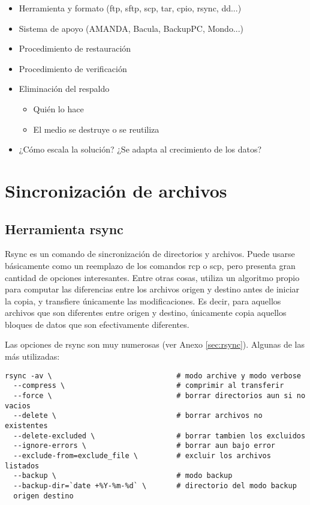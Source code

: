 \begin{itemize}
	\item Herramienta y formato (ftp, sftp, scp, tar, cpio, rsync, dd...)  
	\item Sistema de apoyo (AMANDA, Bacula, BackupPC, Mondo...)
	\item Procedimiento de restauración
	\item Procedimiento de verificación
	\item Eliminación del respaldo
	\begin{itemize}
		\item Quién lo hace
		\item El medio se destruye o se reutiliza 
	\end{itemize}
	\item ¿Cómo escala la solución? ¿Se adapta al crecimiento de los datos?
\end{itemize}



\section{Sincronización de archivos}

\subsection{Herramienta rsync}

Rsync es un comando de sincronización de directorios y archivos. Puede usarse básicamente como un reemplazo de los comandos rcp o scp, pero presenta gran cantidad de opciones interesantes. Entre otras cosas, utiliza un algoritmo propio para computar las diferencias entre los archivos origen y destino antes de iniciar la copia, y transfiere únicamente las modificaciones. Es decir, para aquellos archivos que son diferentes entre origen y destino, únicamente copia aquellos bloques de datos que son efectivamente diferentes.  

Las opciones de rsync son muy numerosas (ver Anexo \ref{sec:rsync}). Algunas de las más utilizadas:


\begin{lstlisting}
rsync -av \                             # modo archive y modo verbose
  --compress \                          # comprimir al transferir
  --force \                             # borrar directorios aun si no vacios
  --delete \                            # borrar archivos no existentes
  --delete-excluded \                   # borrar tambien los excluidos
  --ignore-errors \                     # borrar aun bajo error
  --exclude-from=exclude_file \         # excluir los archivos listados
  --backup \                            # modo backup
  --backup-dir=`date +%Y-%m-%d` \       # directorio del modo backup
  origen destino
\end{lstlisting}

